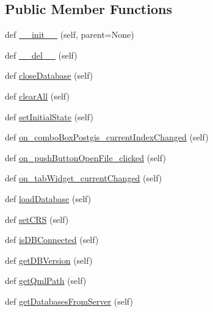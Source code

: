 \subsection*{Public Member Functions}
\begin{DoxyCompactItemize}
\item 
def \mbox{\hyperlink{class_dsg_tools_1_1_custom_widgets_1_1connection_widget_1_1_connection_widget_a6982904c57913be2d825dcc83ea22349}{\+\_\+\+\_\+init\+\_\+\+\_\+}} (self, parent=None)
\item 
def \mbox{\hyperlink{class_dsg_tools_1_1_custom_widgets_1_1connection_widget_1_1_connection_widget_a14c45f19e2a6d05229efad3806ae7a05}{\+\_\+\+\_\+del\+\_\+\+\_\+}} (self)
\item 
def \mbox{\hyperlink{class_dsg_tools_1_1_custom_widgets_1_1connection_widget_1_1_connection_widget_a5db934d202ff7387e420a05fbf1508ed}{close\+Database}} (self)
\item 
def \mbox{\hyperlink{class_dsg_tools_1_1_custom_widgets_1_1connection_widget_1_1_connection_widget_a08811cc473d6f2a2c4775a6f93e825e4}{clear\+All}} (self)
\item 
def \mbox{\hyperlink{class_dsg_tools_1_1_custom_widgets_1_1connection_widget_1_1_connection_widget_a28b6fab24dc11d1aa3d81b5e22cd80bb}{set\+Initial\+State}} (self)
\item 
def \mbox{\hyperlink{class_dsg_tools_1_1_custom_widgets_1_1connection_widget_1_1_connection_widget_a111369eb95d1564237c0ebd816696db5}{on\+\_\+combo\+Box\+Postgis\+\_\+current\+Index\+Changed}} (self)
\item 
def \mbox{\hyperlink{class_dsg_tools_1_1_custom_widgets_1_1connection_widget_1_1_connection_widget_a6333c3b12ad8e2d0e48bd79f839a22b6}{on\+\_\+push\+Button\+Open\+File\+\_\+clicked}} (self)
\item 
def \mbox{\hyperlink{class_dsg_tools_1_1_custom_widgets_1_1connection_widget_1_1_connection_widget_a3d4a5a9dc4b87b4abffd9d41a7407a42}{on\+\_\+tab\+Widget\+\_\+current\+Changed}} (self)
\item 
def \mbox{\hyperlink{class_dsg_tools_1_1_custom_widgets_1_1connection_widget_1_1_connection_widget_a096129937bbcdb652013088000273af0}{load\+Database}} (self)
\item 
def \mbox{\hyperlink{class_dsg_tools_1_1_custom_widgets_1_1connection_widget_1_1_connection_widget_a33b3f9d4a7fa240bda00d7d874e7fa49}{set\+C\+RS}} (self)
\item 
def \mbox{\hyperlink{class_dsg_tools_1_1_custom_widgets_1_1connection_widget_1_1_connection_widget_a4f15ad54d84acb8cd9dc06906e54a8d1}{is\+D\+B\+Connected}} (self)
\item 
def \mbox{\hyperlink{class_dsg_tools_1_1_custom_widgets_1_1connection_widget_1_1_connection_widget_a868be5c3d72e9f02fd128876ae6f4468}{get\+D\+B\+Version}} (self)
\item 
def \mbox{\hyperlink{class_dsg_tools_1_1_custom_widgets_1_1connection_widget_1_1_connection_widget_a265c92cef40ed91119a1b831141acb11}{get\+Qml\+Path}} (self)
\item 
def \mbox{\hyperlink{class_dsg_tools_1_1_custom_widgets_1_1connection_widget_1_1_connection_widget_ae789614935c50c34eb9d3df90859938e}{get\+Databases\+From\+Server}} (self)
\end{DoxyCompactItemize}
